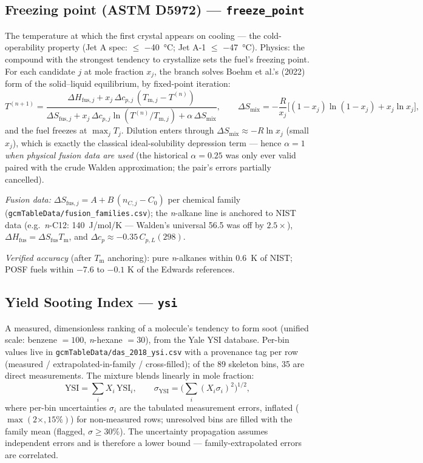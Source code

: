 \documentclass[11pt]{article}
\newcommand{\Tm}{T_{\mathrm{m}}}
\begin{document}
\subsection{Freezing point (ASTM D5972) --- \texttt{freeze\_point}}
The temperature at which the first crystal appears on cooling --- the
cold-operability property (Jet A spec: $\le$ \SI{-40}{\celsius}; Jet A-1
$\le$ \SI{-47}{\celsius}). Physics: the compound with the strongest tendency
to crystallize sets the fuel's freezing point. For each candidate $j$ at
mole fraction $x_j$, the branch solves Boehm et al.'s (2022) form of the
solid--liquid equilibrium, by fixed-point iteration:
\begin{equation}
  T^{(n+1)} =
  \frac{\Delta H_{\mathrm{fus},j} + x_j\, \Delta c_{p,j}\, (T_{\mathrm{m},j}-T^{(n)})}
       {\Delta S_{\mathrm{fus},j} + x_j\, \Delta c_{p,j} \ln(T^{(n)}/T_{\mathrm{m},j})
        + \alpha\, \Delta S_{\mathrm{mix}}},
  \qquad
  \Delta S_{\mathrm{mix}} = -\frac{R}{x_j}
  \big[ (1{-}x_j)\ln(1{-}x_j) + x_j \ln x_j \big],
\end{equation}
and the fuel freezes at $\max_j T_j$. Dilution enters through
$\Delta S_{\mathrm{mix}} \approx -R \ln x_j$ (small $x_j$), which is
exactly the classical ideal-solubility depression term --- hence
$\alpha = 1$ \emph{when physical fusion data are used} (the historical
$\alpha = 0.25$ was only ever valid paired with the crude Walden
approximation; the pair's errors partially cancelled).

\emph{Fusion data:} $\Delta S_{\mathrm{fus},j} = A + B\,(n_{C,j} - C_0)$
per chemical family (\texttt{gcmTableData/fusion\_families.csv}); the
\emph{n}-alkane line is anchored to NIST data (e.g.\ \emph{n}-C12:
\SI{140}{J/mol/K} --- Walden's universal \SI{56.5}{} was off by
$2.5\times$), $\Delta H_{\mathrm{fus}} = \Delta S_{\mathrm{fus}} \Tm$, and
$\Delta c_p \approx -0.35\, C_{p,L}(298)$.

\emph{Verified accuracy} (after $\Tm$ anchoring): pure \emph{n}-alkanes
within \SI{0.6}{K} of NIST; POSF fuels within $-7.6$ to $-0.1$ K of the
Edwards references.

\subsection{Yield Sooting Index --- \texttt{ysi}}
A measured, dimensionless ranking of a molecule's tendency to form soot
(unified scale: benzene $=100$, \emph{n}-hexane $=30$), from the Yale YSI
database. Per-bin values live in \texttt{gcmTableData/das\_2018\_ysi.csv}
with a provenance tag per row (measured / extrapolated-in-family /
cross-filled); of the 89 skeleton bins, 35 are direct measurements.
The mixture blends linearly in mole fraction:
\begin{equation}
  \mathrm{YSI} = \sum_i X_i\, \mathrm{YSI}_i ,
  \qquad
  \sigma_{\mathrm{YSI}} = \Big( \sum_i (X_i \sigma_i)^2 \Big)^{1/2},
\end{equation}
where per-bin uncertainties $\sigma_i$ are the tabulated measurement errors,
inflated ($\max(2\times, 15\%)$) for non-measured rows; unresolved bins are
filled with the family mean (flagged, $\sigma \ge 30\%$). The uncertainty
propagation assumes independent errors and is therefore a lower bound ---
family-extrapolated errors are correlated.
\end{document}
